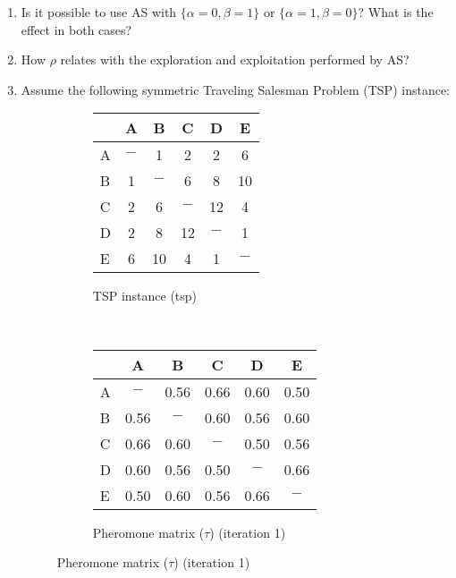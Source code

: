 \documentclass[11pt,a4paper]{article}
\theoremstyle{definition}%
\begin{document}
\begin{enumerate}
 \item Is it possible to use AS with $\{\alpha=0, \beta=1\}$ or  $\{\alpha=1, \beta=0\}$? What is the effect in both cases?
 \item How $\rho$ relates with the exploration and exploitation performed by AS?
 \item Assume the following symmetric Traveling Salesman Problem (TSP)
 instance:\\
   \begin{figure}[ht]
   \begin{subfigure}{0.31\textwidth}
   \begin{tabular} {| l | c |c | c | c | c |}
   \hline
        &  A  &  B  &  C  &  D  & E   \\
    \hline
      A & $-$ &  1  &  2  &  2  & 6   \\
      B &  1  & $-$ &  6  &  8  & 10  \\  
      C &  2  &  6  & $-$ &  12 & 4   \\
      D &  2  &  8  & 12  & $-$ & 1   \\
      E &  6  & 10  &  4  &   1 & $-$  \\
    \hline
   \end{tabular}
   \caption{TSP instance (tsp)}
   \end{subfigure}
   ~~~~~~~~
   \begin{subfigure}{0.45\textwidth}
   \centering
   \begin{tabular} {| l | c |c | c | c | c |}
   \hline
        &  A  &  B  &  C  &  D  & E   \\
    \hline
      A & $-$    &  0.56  &  0.66  &  0.60  & 0.50   \\
      B &  0.56  & $-$    &  0.60  &  0.56  & 0.60  \\  
      C &  0.66  &  0.60  & $-$    &  0.50  & 0.56   \\
      D &  0.60  &  0.56  &  0.50  & $-$    & 0.66   \\
      E &  0.50  &  0.60  &  0.56  &  0.66  & $-$  \\
    \hline
   \end{tabular}
   \caption{Pheromone matrix ($\tau$) (iteration 1) }
   \end{subfigure}
   \end{figure}
   

\end{enumerate}
\end{document}
